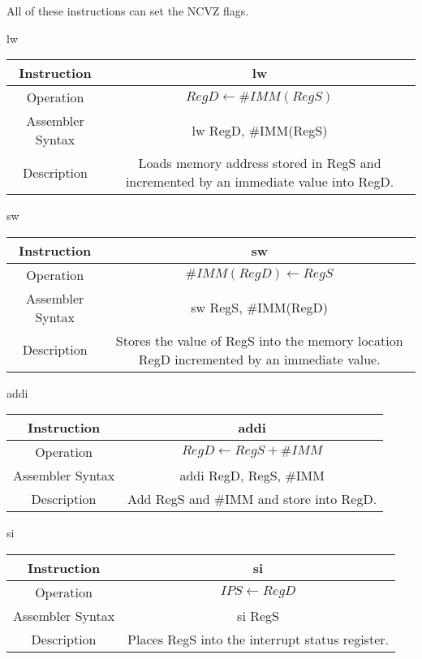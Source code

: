 \documentclass[]{article}
\begin{document}
\noindent All of these instructions can set the NCVZ flags.

lw\\
\begin{tabular}{c|c}\hline
	Instruction & lw\\\hline
	Operation & $RegD \leftarrow \#IMM(RegS)$\\\hline
	Assembler Syntax & lw RegD, \#IMM(RegS)\\\hline
	Description & Loads memory address stored in RegS and incremented by an immediate value into RegD.\\\hline
\end{tabular}\vspace{1.5cm}

sw\\
\begin{tabular}{c|c}\hline
	Instruction & sw\\\hline
	Operation & $\#IMM(RegD) \leftarrow RegS$\\\hline
	Assembler Syntax & sw RegS, \#IMM(RegD)\\\hline
	Description & Stores the value of RegS into the memory location RegD incremented by an immediate value.\\\hline
\end{tabular}\vspace{1.5cm}

addi\\
\begin{tabular}{c|c}\hline
	Instruction & addi\\\hline
	Operation & $RegD \leftarrow RegS + \#IMM$\\\hline
	Assembler Syntax & addi RegD, RegS, \#IMM\\\hline
	Description & Add RegS and \#IMM and store into RegD.\\\hline
\end{tabular}\vspace{1.5cm}

si\\
\begin{tabular}{c|c}\hline
	Instruction & si\\\hline
	Operation & $IPS \leftarrow RegD$\\\hline
	Assembler Syntax & si RegS\\\hline
	Description & Places RegS into the interrupt status register.\\\hline
\end{tabular}\vspace{1.5cm}
\end{document}
